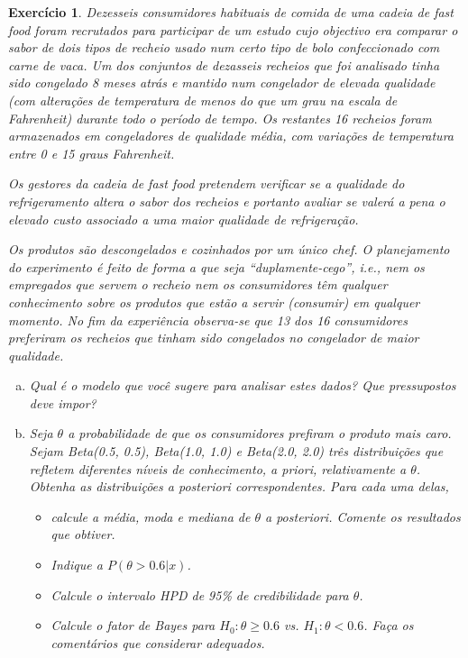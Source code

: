 \documentclass[letter,11pt]{article}
\newtheorem{exer}{Exercício}
\begin{document}
\begin{exer} \rm
Dezesseis consumidores habituais de comida de uma cadeia de fast food foram recrutados
para participar de um estudo cujo objectivo era comparar o sabor de dois tipos de recheio usado num certo tipo de bolo confeccionado com carne de vaca. Um
dos conjuntos de dezasseis recheios que foi analisado tinha sido congelado 8 meses
atrás e mantido num congelador de elevada qualidade (com alterações de temperatura de menos do que um grau na escala de Fahrenheit) durante todo o período de
tempo. Os restantes 16 recheios foram armazenados em congeladores de qualidade média, com variações de temperatura entre 0 e 15 graus Fahrenheit. 

Os gestores da
cadeia de fast food pretendem verificar se a qualidade do refrigeramento altera o sabor
dos recheios e portanto avaliar se valerá a pena o elevado custo associado a uma maior qualidade de refrigeração.

Os produtos são descongelados e cozinhados por um único chef. O planejamento do experimento é feito de forma a que seja “duplamente-cego”, i.e., nem os empregados
que servem o recheio nem os consumidores têm qualquer conhecimento sobre
os produtos que estão a servir (consumir) em qualquer momento. No fim da experiência
observa-se que 13 dos 16 consumidores preferiram os recheios que tinham
sido congelados no congelador de maior qualidade.

\begin{enumerate}[a)]
    \item Qual é o modelo que você sugere para analisar estes dados? Que pressupostos deve impor?
    \item Seja $\theta$ a probabilidade de que os consumidores prefiram o produto mais caro. Sejam Beta(0.5, 0.5), Beta(1.0, 1.0) e Beta(2.0, 2.0) três distribuições que refletem diferentes níveis de conhecimento, a priori, relativamente a $\theta$. Obtenha as distribuições a posteriori correspondentes. Para cada uma delas,
    \begin{itemize}
        \item calcule a média, moda e mediana de $\theta$ a posteriori. Comente os resultados que obtiver.
        \item  Indique a $P(\theta > 0.6 | x)$.
        \item Calcule o intervalo HPD de 95\% de credibilidade para $\theta$.
        \item Calcule o fator de Bayes para $H_0 : \theta \geq 0.6$ vs. $H_1 : \theta < 0.6$. Faça os comentários que considerar adequados.
    \end{itemize}
\end{enumerate}
\end{exer}
\end{document}
